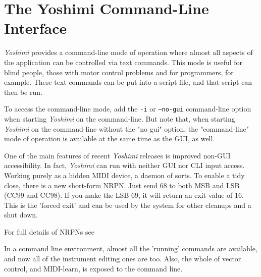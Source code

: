 %
%
%

\section{The Yoshimi Command-Line Interface}
\label{sec:command_line}

   \textsl{Yoshimi} provides a command-line mode of operation where almost
   all aspects of the application can be controlled via text commands.
   This mode is useful for blind people, those with motor control problems
   and for programmers, for example.
   These text commands can be put into a script file, and that script can then
   be run.

   To access the command-line mode,
   add the \texttt{-i} or \texttt{--no-gui} command-line
   option when starting \textsl{Yoshimi} on the command-line.  But note that,
   when starting \textsl{Yoshimi} on the command-line without the "no gui"
   option, the "command-line" mode
   of operation is available at the same time as the GUI, as well.

   One of the main features of recent \textsl{Yoshimi} releases
   is improved non-GUI accessibility.  In fact,
   \textsl{Yoshimi} can run with neither GUI nor CLI input access. Working
   purely as a hidden MIDI device, a daemon of sorts. To enable a tidy close,
   there is a new short-form NRPN. Just send 68 to both MSB and LSB (CC99 and
   CC98). If you make the LSB 69, it will return an exit value of 16. This is
   the 'forced exit' and can be used by the system for other cleanups and a
   shut down.

   For full details of NRPNs see 

   In a command line environment, almost all the 'running' commands are
   available, and now all of the instrument editing ones are too.
   Also, the whole of vector control, and MIDI-learn, is exposed
   to the command line.

